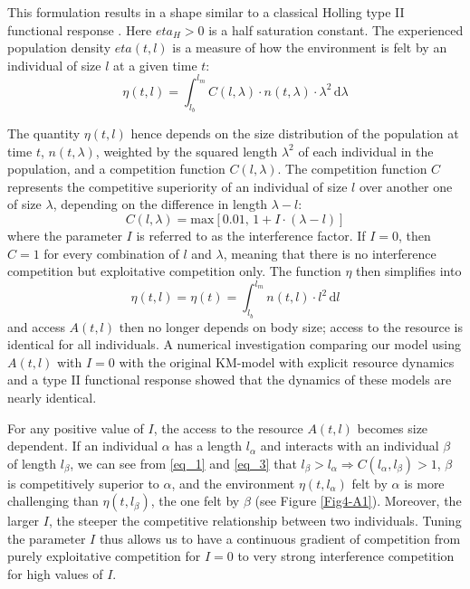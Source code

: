 This formulation results in a shape similar to a classical Holling type II
functional response \autocite{holling1965a}. Here $eta_H>0$ is a half 
saturation constant. The experienced population density $eta(t,l)$ is a measure
of how the environment is felt by an individual of size $l$ at a given time $t$:
\begin{equation}
\label{eq_2}
\eta(t,l)=\int_{l_b}^{l_m} \! C(l,\lambda)\cdot n(t,\lambda)\cdot\lambda^2\, \mathrm{d}\lambda
\end{equation}

The quantity $\eta(t,l)$ hence depends on the size distribution of the
population at time $t$, $n(t,\lambda)$, weighted by the squared length
$\lambda^2$ of each individual in the population, and a competition function
$C(l,\lambda)$. The competition function $C$ represents the competitive
superiority of an individual of size $l$ over another one of size $\lambda$,
depending on the difference in length $\lambda-l$:
\begin{equation}
\label{eq_3}
C(l,\lambda) = \mathrm{max}\left[ 0.01,\, 1+I\cdot(\lambda-l) \right]
\end{equation}
where the parameter $I$ is referred to as the interference factor. If $I=0$,
then $C=1$ for every combination of $l$ and $\lambda$, meaning that there is no
interference competition but exploitative competition only. The function $\eta$
then simplifies into
\begin{equation}
\label{eq_4}
\eta (t,l) = \eta(t) = \int_{l_b}^{l_m} \! n(t,l)\cdot l^2\, \mathrm{d}l
\end{equation}
and access $A(t,l)$ then no longer depends on body size; access to the resource
is identical for all individuals. A numerical investigation comparing our model
using $A(t,l)$ with $I=0$ with the original KM-model with explicit resource
dynamics and a type II functional response showed that the dynamics of these
models are nearly identical.

For any positive value of $I$, the access to the resource $A(t,l)$ becomes size
dependent. If an individual $\alpha$ has a length $l_{\alpha}$ and interacts
with an individual $\beta$ of length $l_{\beta}$, we can see from \eqref{eq_1}
and \eqref{eq_3} that $l_{\beta}>l_{\alpha} \Rightarrow
C(l_{\alpha},l_{\beta})>1$, $\beta$ is competitively superior to $\alpha$, and
the environment $\eta(t,l_{\alpha})$ felt by $\alpha$ is more challenging than
$\eta(t,l_{\beta})$, the one felt by $\beta$ (see Figure \ref{Fig4-A1}).
Moreover, the larger $I$, the steeper the competitive relationship between two
individuals. Tuning the parameter $I$ thus allows us to have a continuous
gradient of competition from purely exploitative competition for $I=0$ to very
strong interference competition for high values of $I$.

